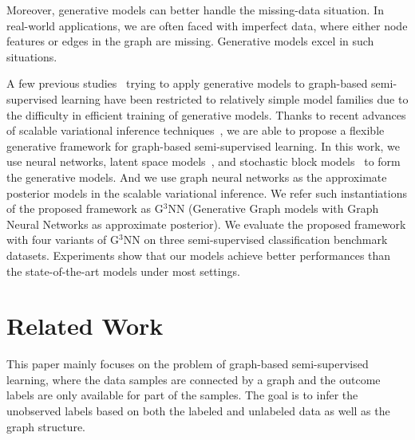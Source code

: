 \documentclass{article}
\begin{document}
Moreover, generative models can better handle the missing-data situation. In real-world applications, we are often faced with imperfect data, where either node features or edges in the graph are missing. Generative models excel in such situations.

A few previous studies~\cite{zhang2018bayesian} trying to apply generative models to graph-based semi-supervised learning have been restricted to relatively simple model families due to the difficulty in efficient training of generative models. Thanks to recent advances of scalable variational inference techniques~\cite{kingma2013auto,kingma2014semi}, we are able to propose a flexible generative framework for graph-based semi-supervised learning. In this work, we use neural networks, latent space models~\cite{hoff2002latent}, and stochastic block models~\cite{holland1983stochastic} to form the generative models. And we use graph neural networks as the approximate posterior models in the scalable variational inference. We refer such instantiations of the proposed framework as G$^3$NN (Generative Graph models with Graph Neural Networks as approximate posterior). We evaluate the proposed framework with four variants of G$^3$NN on three semi-supervised classification benchmark datasets. Experiments show that our models achieve better performances than the state-of-the-art models under most settings. 

 \section{Related Work}
\label{sec:related}
This paper mainly focuses on the problem of graph-based semi-supervised learning, where the data samples are connected by a graph and the outcome labels are only available for part of the samples. The goal is to infer the unobserved labels based on both the labeled and unlabeled data as well as the graph structure.
\end{document}
